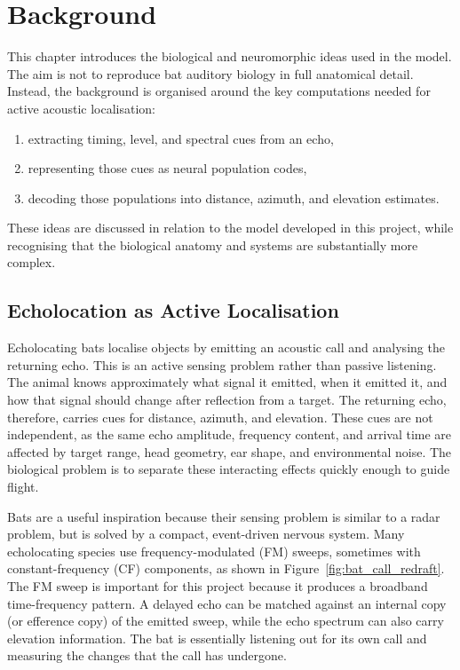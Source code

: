 \chapter{Background} \label{ch:background}

This chapter introduces the biological and neuromorphic ideas used in the model. The aim is not to reproduce bat auditory biology in full anatomical detail. Instead, the background is organised around the key computations needed for active acoustic localisation: 
\begin{enumerate}
    \item extracting timing, level, and spectral cues from an echo,
    \item representing those cues as neural population codes,
    \item decoding those populations into distance, azimuth, and elevation estimates.
\end{enumerate}
These ideas are discussed in relation to the model developed in this project, while recognising that the biological anatomy and systems are substantially more complex.


\section{Echolocation as Active Localisation}

Echolocating bats localise objects by emitting an acoustic call and analysing the returning echo. This is an active sensing problem rather than passive listening. The animal knows approximately what signal it emitted, when it emitted it, and how that signal should change after reflection from a target. The returning echo, therefore, carries cues for distance, azimuth, and elevation. These cues are not independent, as the same echo amplitude, frequency content, and arrival time are affected by target range, head geometry, ear shape, and environmental noise. The biological problem is to separate these interacting effects quickly enough to guide flight.

Bats are a useful inspiration because their sensing problem is similar to a radar problem, but is solved by a compact, event-driven nervous system. Many echolocating species use frequency-modulated (FM) sweeps, sometimes with constant-frequency (CF) components, as shown in Figure~\ref{fig:bat_call_redraft}. The FM sweep is important for this project because it produces a broadband time-frequency pattern. A delayed echo can be matched against an internal copy (or efference copy) of the emitted sweep, while the echo spectrum can also carry elevation information. The bat is essentially listening out for its own call and measuring the changes that the call has undergone. 

